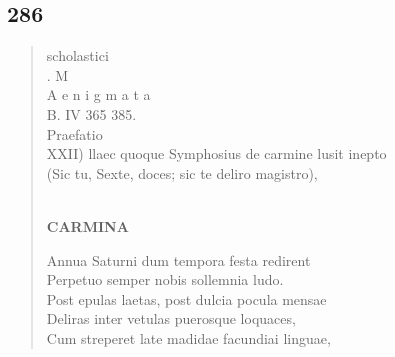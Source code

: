 \documentclass[11pt, a4paper]{report}
\begin{document}
            \subsection*{286}
      \begin{verse}
      scholastici \\ . M \\ A e n i g m a t a \\ B. IV 365 385. \\ Praefatio \\  \lbrack XXII) llaec quoque Symphosius de carmine lusit inepto \\ (Sic tu, Sexte, doces; sic te deliro magistro), \\ 
        ﻿\pagebreak 
    \begin{center} \textbf{CARMINA} \end{center} \marginpar{[222]} Annua Saturni dum tempora festa redirent \\ Perpetuo semper nobis sollemnia ludo. \\ Post epulas laetas, post dulcia pocula mensae \\ Deliras inter vetulas puerosque loquaces, \\ Cum streperet late madidae facundiai linguae, \\ 
      \end{verse}
  
\end{document}
